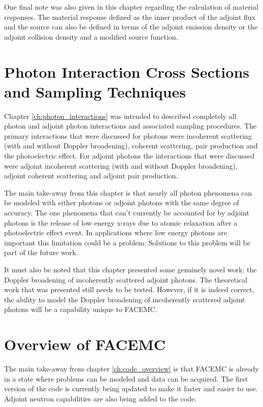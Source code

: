 One final note was also given in this chapter regarding the calculation of 
material responses. The material response defined as the inner product of
the adjoint flux and the source can also be defined in terms of the adjoint
emission density or the adjoint collision density and a modified source
function.

\section{Photon Interaction Cross Sections and Sampling Techniques}
Chapter \ref{ch:photon_interactions} was intended to described completely
all photon and adjoint photon interactions and associated sampling procedures. 
The primary interactions that were discussed for photons were incoherent 
scattering (with and without Doppler broadening), coherent scattering, pair 
production and the photoelectric effect. For adjoint photons the interactions
that were discussed were adjoint incoherent scattering (with and without
Doppler broadening), adjoint coherent scattering and adjoint pair production.

The main take-away from this chapter is that nearly all photon phenomena 
can be modeled with either photons or adjoint photons with the same degree of
accuracy. The one phenomena that can't currently be accounted for by adjoint
photons is the release of low energy x-rays due to atomic relaxation after
a photoelectric effect event. In applications where low energy photons are
important this limitation could be a problem. Solutions to this problem will
be part of the future work. 

It must also be noted that this chapter presented some genuinely novel work:
the Doppler broadening of incoherently scattered adjoint photons. The
theoretical work that was presented still needs to be tested. However, if it
is indeed correct, the ability to model the Doppler broadening of incoherently 
scattered adjoint photons will be a capability unique to FACEMC. 

\section{Overview of FACEMC}
The main take-away from chapter \ref{ch:code_overview} is that FACEMC is
already in a state where problems can be modeled and data can be acquired. 
The first version of the code is currently being updated to make it faster
and easier to use. Adjoint neutron capabilities are also being added to the
code. 

